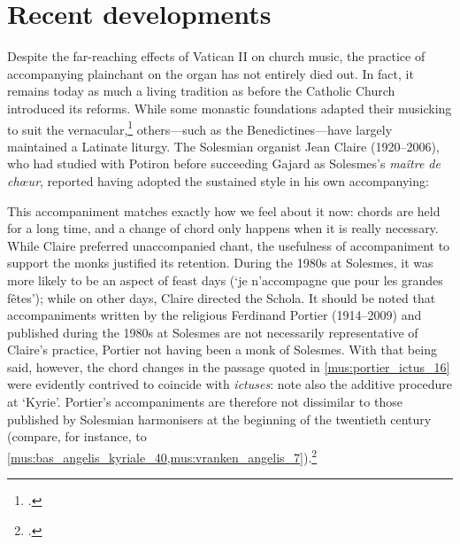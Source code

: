 \hypersetup{bookmarksdepth=-2}
\renewcommand{\chaptername}{POSTSCRIPT}
\renewcommand{\thechapter}{}
\chapter{Recent developments}
\hypersetup{bookmarksdepth=1}
%
Despite the far-reaching effects of Vatican II on church music, the practice of accompanying plainchant on the organ has not entirely died out.
In fact, it remains today as much a living tradition as before the Catholic Church introduced its reforms.
While some monastic foundations adapted their musicking to suit the vernacular,\footcite[114--117]{LynchSingNewSong2019} others---such as the Benedictines---have largely maintained a Latinate liturgy.
The Solesmian organist Jean Claire (1920--2006), who had studied with Potiron before succeeding Gajard as Solesmes's \emph{maître de chœur}, reported having adopted the sustained style in his own accompanying:

  {\cite[345, 397, 400]{Pinguetecolesmusiquedivine1987}}
{This accompaniment matches exactly how we feel about it now: chords are held for a long time, and a change of chord only happens when it is really necessary.}
\noindent
While Claire preferred unaccompanied chant, the usefulness of accompaniment to support the monks justified its retention.
During the 1980s at Solesmes, it was more likely to be an aspect of feast days (`je n'accompagne que pour les grandes fêtes'); while on other days, Claire directed the Schola.
It should be noted that accompaniments written by the religious Ferdinand Portier (1914--2009) and published during the 1980s at Solesmes are not necessarily representative of Claire's practice, Portier not having been a monk of Solesmes.
With that being said, however, the chord changes in the passage quoted in \cref{mus:portier_ictus_16} were evidently contrived to coincide with \emph{ictuses}: note also the additive procedure at `Kyrie'.
Portier's accompaniments are therefore not dissimilar to those published by Solesmian harmonisers at the beginning of the twentieth century (compare, for instance, to \cref{mus:bas_angelis_kyriale_40,mus:vranken_angelis_7}).\footcite[unpaginated `Avertissement', p.~16]{PortierLibercantualiscomitante1981}

